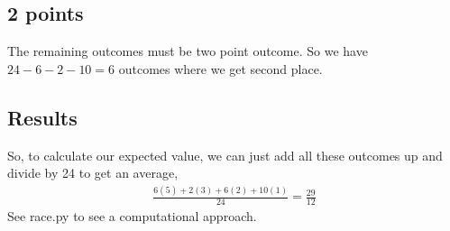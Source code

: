\documentclass{article}
\begin{document}
\subsection*{2 points}
The remaining outcomes must be two point outcome. So we have $24 - 6 - 2 - 10 = 6$ outcomes where we get second place.

\subsection*{Results}
So, to calculate our expected value, we can just add all these outcomes up and divide by 24 to get an average,
\begin{align*}
    \frac{6(5) + 2(3) + 6(2) + 10(1)}{24} = \frac{29}{12}
\end{align*}
See race.py to see a computational approach.
\end{document}
